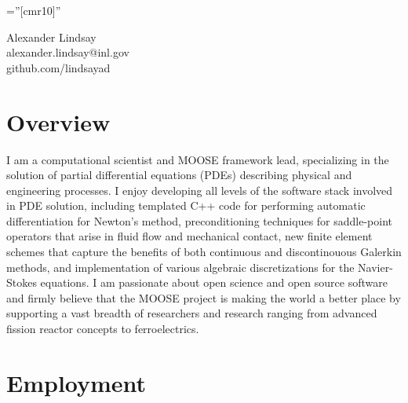 \documentclass[a4paper,10pt]{article} %
\begin{document}
\pagestyle{empty} %

\font\fb=''[cmr10]'' %

\begin{center}
{\Large Alexander Lindsay}\\
alexander.lindsay@inl.gov\\
github.com/lindsayad\\
\end{center}


\section{Overview}

I am a computational scientist and MOOSE framework lead, specializing
in the solution of partial differential equations (PDEs) describing physical and
engineering processes. I enjoy developing all levels of the software stack
involved in PDE solution, including templated C++ code for performing
automatic differentiation for Newton's method, preconditioning techniques for
saddle-point operators that arise in fluid flow and mechanical contact, new finite element schemes that
capture the benefits of both continuous and discontinouous Galerkin methods, and
implementation of various algebraic discretizations for the Navier-Stokes
equations. I am passionate about open science and open source software and
firmly believe that the MOOSE project is making the world
a better place by supporting a vast breadth of researchers and research ranging
from advanced fission reactor concepts to ferroelectrics.


\section{Employment}
\end{document}
